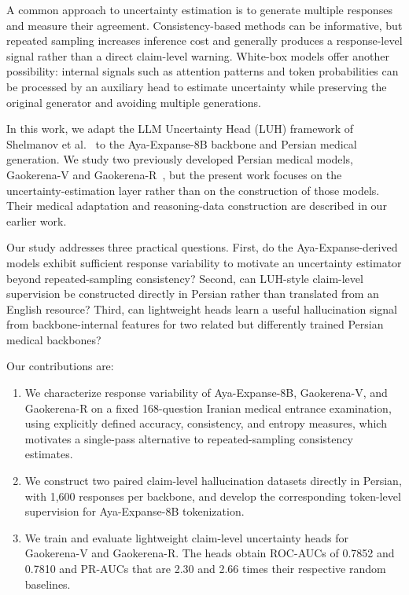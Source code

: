 \documentclass[conference]{IEEEtran}
\begin{document}
A common approach to uncertainty estimation is to generate multiple responses and measure their agreement. Consistency-based methods can be informative, but repeated sampling increases inference cost and generally produces a response-level signal rather than a direct claim-level warning. White-box models offer another possibility: internal signals such as attention patterns and token probabilities can be processed by an auxiliary head to estimate uncertainty while preserving the original generator and avoiding multiple generations.

In this work, we adapt the LLM Uncertainty Head (LUH) framework of Shelmanov et al.~\cite{b1} to the Aya-Expanse-8B backbone and Persian medical generation. We study two previously developed Persian medical models, Gaokerena-V and Gaokerena-R~\cite{b2,b3}, but the present work focuses on the uncertainty-estimation layer rather than on the construction of those models. Their medical adaptation and reasoning-data construction are described in our earlier work.

Our study addresses three practical questions. First, do the Aya-Expanse-derived models exhibit sufficient response variability to motivate an uncertainty estimator beyond repeated-sampling consistency? Second, can LUH-style claim-level supervision be constructed directly in Persian rather than translated from an English resource? Third, can lightweight heads learn a useful hallucination signal from backbone-internal features for two related but differently trained Persian medical backbones?

Our contributions are:

\begin{enumerate}[leftmargin=*]

\item We characterize response variability of Aya-Expanse-8B, Gaokerena-V, and Gaokerena-R on a fixed 168-question Iranian medical entrance examination, using explicitly defined accuracy, consistency, and entropy measures, which motivates a single-pass alternative to repeated-sampling consistency estimates.

\item We construct two paired claim-level hallucination datasets directly in Persian, with 1,600 responses per backbone, and develop the corresponding token-level supervision for Aya-Expanse-8B tokenization.

\item We train and evaluate lightweight claim-level uncertainty heads for Gaokerena-V and Gaokerena-R. The heads obtain ROC-AUCs of 0.7852 and 0.7810 and PR-AUCs that are 2.30 and 2.66 times their respective random baselines.

\end{enumerate}
\end{document}
